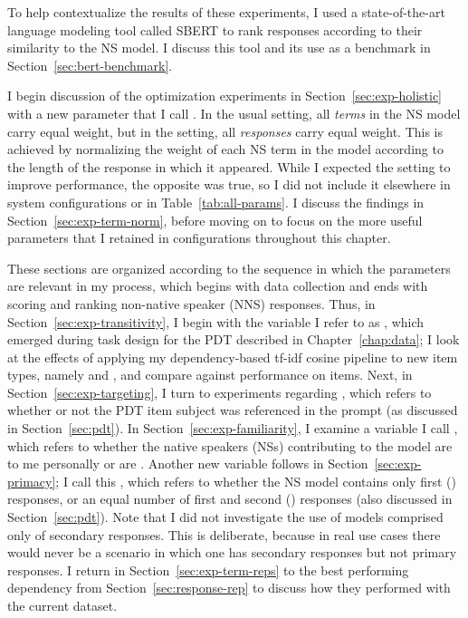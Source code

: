 To help contextualize the results of these experiments, I used a state-of-the-art language modeling tool called SBERT to rank responses according to their similarity to the NS model. I discuss this tool and its use as a benchmark in Section~\ref{sec:bert-benchmark}.

I begin discussion of the optimization experiments in Section~\ref{sec:exp-holistic} with a new parameter that I call . In the usual  setting, all \textit{terms} in the NS model carry equal weight, but in the  setting, all \textit{responses} carry equal weight. This is achieved by normalizing the weight of each NS term in the model according to the length of the response in which it appeared. While I expected the  setting to improve performance, the opposite was true, so I did not include it elsewhere in system configurations or in Table~\ref{tab:all-params}. I discuss the findings in Section~\ref{sec:exp-term-norm}, before moving on to focus on the more useful parameters that I retained in configurations throughout this chapter.

These sections are organized according to the sequence in which the parameters are relevant in my process, which begins with data collection and ends with scoring and ranking non-native speaker (NNS) responses. Thus, in Section~\ref{sec:exp-transitivity}, I begin with the variable I refer to as , which emerged during task design for the PDT described in Chapter~\ref{chap:data}; I look at the effects of applying my dependency-based tf-idf cosine pipeline to new item types, namely  and , and compare against performance on  items. Next, in Section~\ref{sec:exp-targeting}, I turn to experiments regarding , which refers to whether or not the PDT item subject was referenced in the prompt (as discussed in Section~\ref{sec:pdt}). In Section~\ref{sec:exp-familiarity}, I examine a variable I call , which refers to whether the native speakers (NSs) contributing to the model are  to me personally or are . Another new variable follows in Section~\ref{sec:exp-primacy}; I call this , which refers to whether the NS model contains only first () responses, or an equal number of first and second () responses (also discussed in Section~\ref{sec:pdt}). Note that I did not investigate the use of models comprised only of secondary responses. This is deliberate, because in real use cases there would never be a scenario in which one has secondary responses but not primary responses. I return in Section~\ref{sec:exp-term-reps} to the best performing dependency  from Section~\ref{sec:response-rep} to discuss how they performed with the current dataset.

